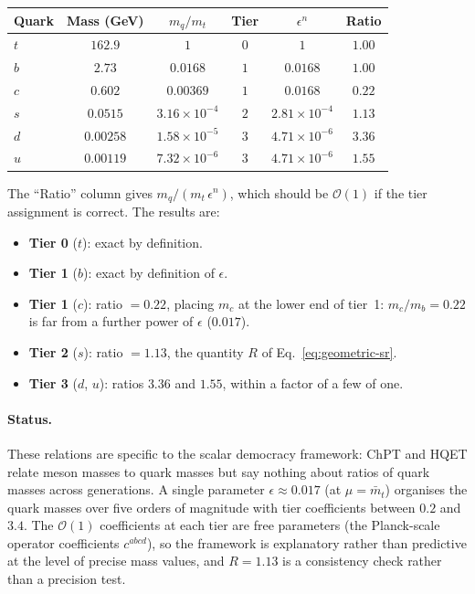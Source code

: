\documentclass[11pt,a4paper]{article}
\newcommand{\Ord}{\mathcal{O}}
\theoremstyle{plain}
\begin{document}
\begin{center}
\renewcommand{\arraystretch}{1.2}
\begin{tabular}{lccccc}
\toprule
\textbf{Quark} & \textbf{Mass (GeV)} & \textbf{$m_q/m_t$}
  & \textbf{Tier} & \textbf{$\epsilon^n$} & \textbf{Ratio} \\
\midrule
$t$ & $162.9$ & $1$ & $0$ & $1$ & $1.00$ \\
$b$ & $2.73$ & $0.0168$ & $1$ & $0.0168$ & $1.00$ \\
$c$ & $0.602$ & $0.00369$ & $1$ & $0.0168$ & $0.22$ \\
$s$ & $0.0515$ & $3.16 \times 10^{-4}$ & $2$ & $2.81 \times 10^{-4}$ & $1.13$ \\
$d$ & $0.00258$ & $1.58 \times 10^{-5}$ & $3$ & $4.71 \times 10^{-6}$ & $3.36$ \\
$u$ & $0.00119$ & $7.32 \times 10^{-6}$ & $3$ & $4.71 \times 10^{-6}$ & $1.55$ \\
\bottomrule
\end{tabular}
\end{center}

The ``Ratio'' column gives $m_q/(m_t\,\epsilon^n)$, which should be
$\Ord(1)$ if the tier assignment is correct.  The results are:
\begin{itemize}[nosep]
  \item \textbf{Tier 0} ($t$): exact by definition.
  \item \textbf{Tier 1} ($b$): exact by definition of $\epsilon$.
  \item \textbf{Tier 1} ($c$): ratio $= 0.22$, placing $m_c$ at the
    lower end of tier~1: $m_c/m_b = 0.22$ is far from a further power
    of $\epsilon$ ($0.017$).
  \item \textbf{Tier 2} ($s$): ratio $= 1.13$, the quantity $R$ of
    Eq.~\eqref{eq:geometric-sr}.
  \item \textbf{Tier 3} ($d$, $u$): ratios $3.36$ and $1.55$, within a
    factor of a few of one.
\end{itemize}

\paragraph{Status.} These relations are specific to the scalar
democracy framework: ChPT and HQET relate meson masses to quark masses
but say nothing about ratios of quark masses across generations.  A
single parameter $\epsilon \approx 0.017$ (at $\mu = \bar{m}_t$)
organises the quark masses over five orders of magnitude with tier
coefficients between $0.2$ and $3.4$.  The $\Ord(1)$ coefficients at
each tier are free parameters (the Planck-scale operator coefficients
$c^{abcd}$), so the framework is explanatory rather than predictive at
the level of precise mass values, and $R = 1.13$ is a consistency check
rather than a precision test.
\end{document}
